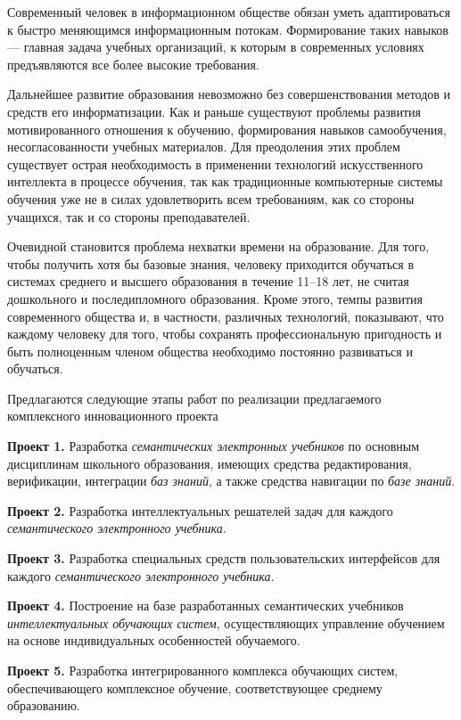 Современный человек в информационном обществе обязан уметь адаптироваться к быстро меняющимся информационным потокам. Формирование таких навыков --- главная задача учебных организаций, к которым в современных условиях предъявляются все более высокие требования.

Дальнейшее развитие образования невозможно без совершенствования методов и средств его информатизации. Как и раньше существуют проблемы развития мотивированного отношения к обучению, формирования навыков самообучения, несогласованности учебных материалов. Для преодоления этих проблем существует острая необходимость в применении технологий искусственного интеллекта в процессе обучения, так как традиционные компьютерные системы обучения уже не в силах удовлетворить всем требованиям, как со стороны учащихся, так и со стороны преподавателей.

Очевидной становится проблема нехватки времени на образование. Для того, чтобы получить хотя бы базовые знания, человеку приходится обучаться в системах среднего и высшего образования в течение 11--18 лет, не считая дошкольного и последипломного образования. Кроме этого, темпы развития современного общества и, в частности, различных технологий, показывают, что каждому человеку для того, чтобы сохранять профессиональную пригодность и быть полноценным членом общества необходимо постоянно развиваться и обучаться.

Предлагаются следующие этапы работ по реализации предлагаемого комплексного инновационного проекта

\textbf{Проект 1.} Разработка \textit{семантических электронных учебников} по основным дисциплинам школьного образования, имеющих средства редактирования, верификации, интеграции \textit{баз знаний}, а также средства навигации по \textit{базе знаний}.

\textbf{Проект 2.} Разработка интеллектуальных решателей задач для каждого \textit{семантического электронного учебника}.

\textbf{Проект 3.} Разработка специальных средств пользовательских интерфейсов для каждого \textit{семантического электронного учебника}.

\textbf{Проект 4.} Построение на базе разработанных семантических учебников \textit{интеллектуальных обучающих систем}, осуществляющих управление обучением на основе индивидуальных особенностей обучаемого.

\textbf{Проект 5.} Разработка интегрированного комплекса обучающих систем, обеспечивающего комплексное обучение, соответствующее среднему образованию.

